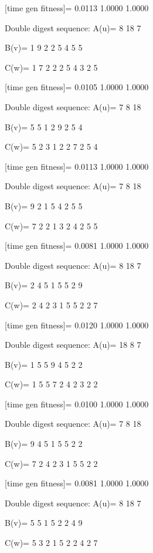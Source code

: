 [time gen fitness]=
    0.0113    1.0000    1.0000

Double digest sequence:
A(u)=
     8    18     7

B(v)=
     1     9     2     2     5     4     5     5

C(w)=
     1     7     2     2     2     5     4     3     2     5

[time gen fitness]=
    0.0105    1.0000    1.0000

Double digest sequence:
A(u)=
     7     8    18

B(v)=
     5     5     1     2     9     2     5     4

C(w)=
     5     2     3     1     2     2     7     2     5     4

[time gen fitness]=
    0.0113    1.0000    1.0000

Double digest sequence:
A(u)=
     7     8    18

B(v)=
     9     2     1     5     4     2     5     5

C(w)=
     7     2     2     1     3     2     4     2     5     5

[time gen fitness]=
    0.0081    1.0000    1.0000

Double digest sequence:
A(u)=
     8    18     7

B(v)=
     2     4     5     1     5     5     2     9

C(w)=
     2     4     2     3     1     5     5     2     2     7

[time gen fitness]=
    0.0120    1.0000    1.0000

Double digest sequence:
A(u)=
    18     8     7

B(v)=
     1     5     5     9     4     5     2     2

C(w)=
     1     5     5     7     2     4     2     3     2     2

[time gen fitness]=
    0.0100    1.0000    1.0000

Double digest sequence:
A(u)=
     7     8    18

B(v)=
     9     4     5     1     5     5     2     2

C(w)=
     7     2     4     2     3     1     5     5     2     2

[time gen fitness]=
    0.0081    1.0000    1.0000

Double digest sequence:
A(u)=
     8    18     7

B(v)=
     5     5     1     5     2     2     4     9

C(w)=
     5     3     2     1     5     2     2     4     2     7

